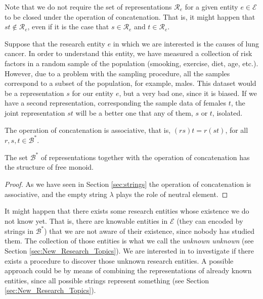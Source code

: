 Note that we do not require the set of representations $\mathcal{R}_e$ for a given entity $e \in \mathcal{E}$ to be closed under the operation of concatenation. That is, it might happen that $st \notin \mathcal{R}_e$, even if it is the case that $s \in \mathcal{R}_e$ and $t \in \mathcal{R}_e$.

\begin{example}
\label{ex:lung_cancer}
Suppose that the research entity $e$ in which we are interested is the causes of lung cancer. In order to understand this entity, we have measured a collection of risk factors in a random sample of the population (smooking, exercise, diet, age, etc.). However, due to a problem with the sampling procedure, all the samples correspond to a subset of the population, for example, males. This dataset would be a representation $s$ for our entity $e$, but a very bad one, since it is biased. If we have a second representation, corresponding the sample data of females $t$, the joint representation $st$ will be a better one that any of them, $s$ or $t$, isolated.
\end{example}

The operation of concatenation is associative, that is, $(rs)t = r(st)$, for all $r, s, t \in \mathcal{B}^\ast$.

\begin{proposition}
The set $\mathcal{B}^\ast$ of representations together with the operation of concatenation has the structure of free monoid.
\end{proposition}
\begin{proof}
As we have seen in Section \ref{sec:strings} the operation of concatenation is associative, and the empty string $\lambda$ plays the role of neutral element.
\end{proof}

It might happen that there exists some research entities whose existence we do not know yet. That is, there are knowable entities in $\mathcal{E}$ (they can encoded by strings in $\mathcal{B}^\ast$) that we are not aware of their existence, since nobody has studied them. The collection of those entities is what we call the \emph{unknown unknown} (see Section \ref{sec:New_Research_Topics}). We are interested in to investigate if there exists a procedure to discover those unknown research entities. A possible approach could be by means of combining the representations of already known entities, since all possible strings represent something (see Section \ref{sec:New_Research_Topics}).

